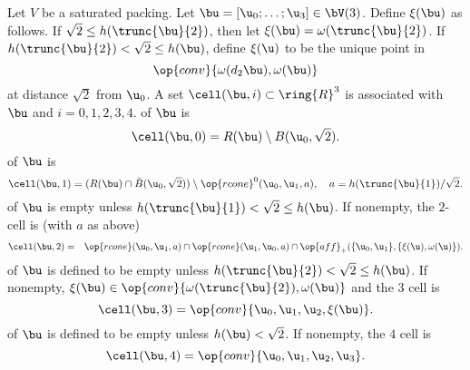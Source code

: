 \begin{definition} 
  Let $V$ be a saturated packing.  Let $\bu=[\u_0;\ldots;\u_3]\in
  \bV(3)$.  Define $\xi(\bu)$ as follows.  If $\sqrt2\le
  h(\trunc{\bu}{2})$, then let $\xi(\bu)=\omega(\trunc{\bu}{2})$.  If
  $h(\trunc{\bu}{2})<\sqrt2\le h(\bu)$, define $\xi(\u)$
  to be the unique point in
\[
\op{conv}\{\omega(d_2\bu),\omega(\bu)\}
\]
at distance $\sqrt2$ from $\u_0$.  
A set $\cell(\bu,i)\subset\ring{R}^3$ is associated with $\bu$ and $i=0,1,2,3,4$.  
\hfill\break\smallskip 
{} of $\bu$
is
\begin{displaymath} 
\cell(\bu,0) = R(\bu)\setminus B(\u_0,\sqrt2).%
\end{displaymath}
\bigskip
{} of $\bu$ is 
\begin{displaymath} 
\cell(\bu,1) = (R(\bu) \cap  \bar B(\u_0,\sqrt2))\setminus \op{rcone}^0(\u_0,\u_1,a),
\quad a={h(\trunc{\bu}{1})}/{\sqrt2}.
\end{displaymath}
\bigskip
{} of $\bu$ is
empty unless $h(\trunc{\bu}{1})<\sqrt2\le h(\bu)$.  If nonempty, the $2$-cell is
(with $a$ as above)
\begin{eqnarray*} 
\cell(\bu,2) &=& 
 \op{rcone}(\u_0,\u_1,a)\cap \op{rcone}(\u_1,\u_0,a)\cap 
\op{aff}_+(\{\u_0,\u_1\},\{\xi(\u),\omega(\u)\}).
\end{eqnarray*}
\bigskip
{} of $\bu$ is defined to be empty unless 
$h(\trunc{\bu}{2}) <\sqrt2 \le h(\bu)$.
If nonempty, $\xi(\bu)\in \op{conv}\{\omega(\trunc{\bu}{2}),\omega(\bu)\}$
and  the $3$ cell is
\begin{displaymath} 
\cell(\bu,3) = \op{conv}\{ \u_0, \u_1, \u_2,\xi(\bu)\}.
\end{displaymath}
\bigskip
{} of $\bu$ is defined to be empty unless
$h(\bu) <\sqrt2$.
If nonempty, the $4$ cell is
\begin{displaymath} 
\cell(\bu,4) = \op{conv}\{ \u_0, \u_1, \u_2, \u_3\}.
\end{displaymath}
\end{definition}
%


